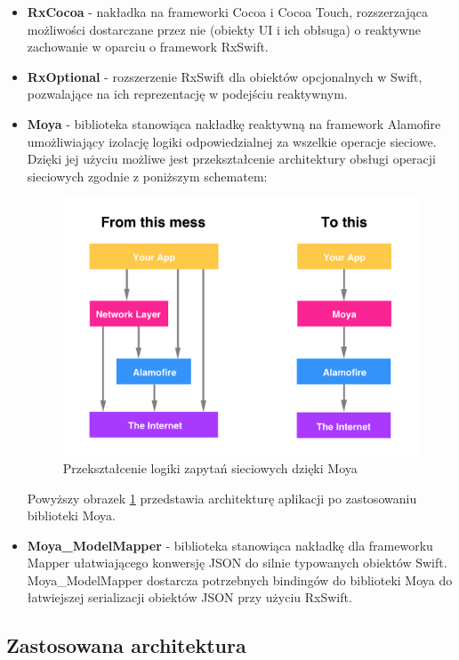 \documentclass[12pt,oneside,a4paper]{report}
\begin{document}
\begin{itemize}
	\item  \textbf{RxCocoa} - nakładka na frameworki Cocoa i Cocoa Touch, rozszerzająca możliwości dostarczane przez nie (obiekty UI i ich obłsuga) o reaktywne zachowanie w oparciu o framework RxSwift.  
	\item  \textbf{RxOptional} - rozszerzenie RxSwift dla obiektów opcjonalnych w Swift, pozwalające na ich reprezentację w podejściu reaktywnym.
	\item  \textbf{Moya} - biblioteka stanowiąca nakładkę reaktywną na framework Alamofire\cite{alamofire} umożliwiający izolację logiki odpowiedzialnej za wszelkie operacje sieciowe. Dzięki jej użyciu możliwe jest przekształcenie architektury obsługi operacji sieciowych zgodnie z poniższym schematem:
	\begin{figure}[ht!]
		\centering
		\includegraphics[width=13cm]{moyaDiagram}
		\caption{Przekształcenie logiki zapytań sieciowych dzięki Moya\cite{moyaScheme}}
		\label{moyaDiagram}
	\end{figure}
	Powyższy obrazek \ref{moyaDiagram} przedstawia architekturę aplikacji po zastosowaniu biblioteki Moya.
	\item  \textbf{Moya\_ModelMapper} - biblioteka stanowiąca nakładkę dla frameworku Mapper\cite{mapper} ułatwiającego konwersję JSON do silnie typowanych obiektów Swift. Moya\_ModelMapper dostarcza potrzebnych bindingów do biblioteki Moya do łatwiejszej serializacji obiektów JSON przy użyciu RxSwift.
\end{itemize}
\pagebreak
\subsection{Zastosowana architektura}
\end{document}
